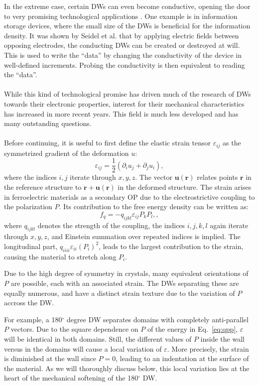 In the extreme case, certain DWs can even become conductive, opening the door to very promising technological applications \cite{Seidel2009}.
One example is in information storage devices, where the small size of the DWs is beneficial for the information density.
It was shown by Seidel et al. that by applying electric fields between opposing electrodes, the conducting DWs can be created or destroyed at will. This is used to write the ``data'' by changing the conductivity of the device in well-defined increments.
Probing the conductivity is then equivalent to reading the ``data''. 
\\\\
While this kind of technological promise has driven much of the research of DWs towards their electronic properties, interest for their mechanical characteristics has increased in more recent years.
This field is much less developed and has many outstanding questions.
\\\\
Before continuing, it is useful to first define the elastic strain tensor $\varepsilon_{ij}$ as the symmetrized gradient of the deformation $u$:
\begin{equation}
\varepsilon_{ij} = \frac{1}{2}(\partial_i u_j + \partial_j u_i),
\end{equation}
where the indices $i,j$ iterate through $x, y, z$.
The vector $\bm{u}(\bm{r})$ relates points $\bm{r}$ in the reference structure to $\bm{r} + \bm{u}(\bm{r})$ in the deformed structure.
The strain arises in ferroelectric materials as a secondary OP due to the electrostrictive coupling to the polarization $P$.
Its contribution to the free energy density can be written as:
\begin{equation}
	f_{q}=-q_{ijkl}\varepsilon_{ij}P_{k}P_{l},\label{eq:qpp},
\end{equation}
where $q_{ijkl}$ denotes the strength of the coupling, the indices $i, j, k, l$ again iterate through $x, y, z$, and Einstein summation over repeated indices is implied.
The longitudinal part, $q_{iiii} \varepsilon_{ii} (P_i)^2$, leads to the largest contribution to the strain, causing the material to stretch along $P_i$.

Due to the high degree of symmetry in crystals, many equivalent orientations of $P$ are possible, each with an associated strain. The DWs separating these are equally numerous, and have a distinct strain texture due to the variation of $P$ accross the DW.

For example, a 180$^\circ$ degree DW separates domains with completely anti-parallel $P$ vectors.
Due to the square dependence on $P$ of the energy in Eq.~\eqref{eq:qpp}, $\varepsilon$ will be identical in both domains. Still, the different values of $P$ inside the wall versus in the domains will cause a local variation of $\varepsilon$. More precisely, the strain is diminished at the wall since $P=0$, leading to an indentation at the surface of the material.
As we will thoroughly discuss below, this local variation lies at the heart of the mechanical softening of the 180$^\circ$ DW.

